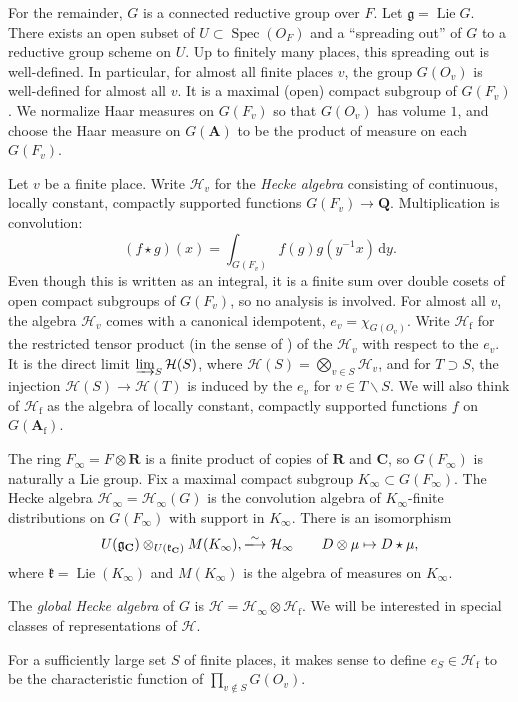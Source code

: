 \documentclass[oneside]{amsart}
\DeclareMathOperator{\lie}{Lie}
\DeclareMathOperator{\spectrum}{Spec}
\newcommand{\dA}{\mathbf{A}}
\newcommand{\dC}{\mathbf{C}}
\newcommand{\dR}{\mathbf{R}}
\newcommand{\dQ}{\mathbf{Q}}
\newcommand{\fg}{\mathfrak{g}}
\newcommand{\fk}{\mathfrak{k}}
\newcommand{\dd}{\mathrm{d}}
\newcommand{\finite}{\mathrm{f}}
\newcommand{\hecke}{\mathcal{H}}
\newcommand{\iso}{\xlongrightarrow\sim}
\begin{document}
For the remainder, $G$ is a connected reductive group over $F$. Let 
$\fg=\lie G$. There exists 
an open subset of $U\subset \spectrum(O_F)$ and a ``spreading out'' of $G$ to 
a reductive group scheme on $U$. Up to finitely many places, this spreading out 
is well-defined. In particular, for almost all finite places $v$, the group 
$G(O_v)$ is well-defined for almost all $v$. It is a maximal (open) compact 
subgroup of $G(F_v)$. We normalize Haar measures on $G(F_v)$ so that 
$G(O_v)$ has volume $1$, and choose the Haar measure on $G(\dA)$ to be the 
product of measure on each $G(F_v)$. 

Let $v$ be a finite place. Write $\hecke_v$ for the \emph{Hecke 
algebra} consisting of continuous, locally constant, compactly supported 
functions $G(F_v) \to \dQ$. Multiplication is convolution: 
\[
  (f\star g)(x) = \int_{G(F_v)} f(g) g(y^{-1} x)\, \dd y .
\]
Even though this is written as an integral, it is a finite sum over double 
cosets of open compact subgroups of $G(F_v)$, so no analysis is involved. For 
almost all $v$, the algebra $\hecke_v$ comes with a canonical idempotent, 
$e_v=\chi_{G(O_v)}$. Write $\hecke_\finite$ for the restricted tensor product 
(in the sense of \cite[\S 2]{f79}) of the $\hecke_v$ with respect to the 
$e_v$. It is the direct limit $\varinjlim_S \hecke(S)$, where 
$\hecke(S)=\bigotimes_{v\in S} \hecke_v$, and for 
$T\supset S$, the injection $\hecke(S)\to \hecke(T)$ is induced by the 
$e_v$ for $v\in T\smallsetminus S$. We will also think of $\hecke_\finite$ as 
the algebra of locally constant, compactly supported functions $f$ on 
$G(\dA_\finite)$. 

The ring $F_\infty=F\otimes\dR$ is a finite product of copies of $\dR$ and 
$\dC$, so  $G(F_\infty)$ is naturally a Lie group. Fix a maximal compact 
subgroup $K_\infty\subset G(F_\infty)$. The Hecke algebra 
$\hecke_\infty=\hecke_\infty(G)$ is the convolution algebra of $K_\infty$-finite 
distributions on $G(F_\infty)$ with support in $K_\infty$. There is an 
isomorphism 
\[
  U(\fg_\dC)\otimes_{U(\fk_\dC)} M(K_\infty), \iso \hecke_\infty \qquad D\otimes \mu\mapsto D\star \mu ,
\]
where $\fk=\lie(K_\infty)$ and $M(K_\infty)$ is the algebra of measures on 
$K_\infty$. 

The \emph{global Hecke algebra} of $G$ is 
$\hecke=\hecke_\infty\otimes\hecke_\finite$. We will be interested in 
special classes of representations of $\hecke$. 

For a sufficiently large set $S$ of finite places, it makes sense to define 
$e_S\in \hecke_\finite$ to be the characteristic function of 
$\prod_{v\notin S} G(O_v)$. 
\end{document}
